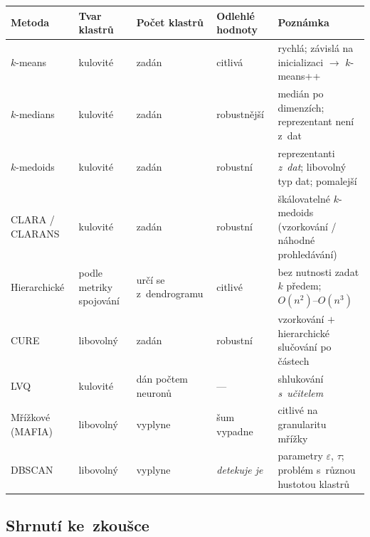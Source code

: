 \documentclass[11pt,a4paper]{article}
\theoremstyle{definition}
\begin{document}
\begin{center}
\small
\begin{tabular}{@{}p{2.6cm}p{2.3cm}p{2.4cm}p{2.2cm}p{5.0cm}@{}}
\toprule
\textbf{Metoda} & \textbf{Tvar klastrů} & \textbf{Počet klastrů} & \textbf{Odlehlé hodnoty}
  & \textbf{Poznámka} \\
\midrule
$k$-means & kulovité & zadán & citlivá & rychlá; závislá na inicializaci $\to$
  $k$-means++ \\
$k$-medians & kulovité & zadán & robustnější & medián po dimenzích; reprezentant není
  z~dat \\
$k$-medoids & kulovité & zadán & robustní & reprezentanti \emph{z~dat}; libovolný typ dat;
  pomalejší \\
CLARA / CLARANS & kulovité & zadán & robustní & škálovatelné $k$-medoids (vzorkování /
  náhodné prohledávání) \\
Hierarchické & podle metriky spojování & určí se z~dendrogramu & citlivé & bez nutnosti
  zadat $k$ předem; $O(n^2)$--$O(n^3)$ \\
CURE & libovolný & zadán & robustní & vzorkování $+$ hierarchické slučování po částech \\
LVQ & kulovité & dán počtem neuronů & --- & shlukování \emph{s~učitelem} \\
Mřížkové (MAFIA) & libovolný & vyplyne & šum vypadne & citlivé na granularitu mřížky \\
DBSCAN & libovolný & vyplyne & \emph{detekuje je} & parametry $\varepsilon$, $\tau$;
  problém s~různou hustotou klastrů \\
\bottomrule
\end{tabular}
\end{center}

\subsection{Shrnutí ke~zkoušce}
\end{document}
